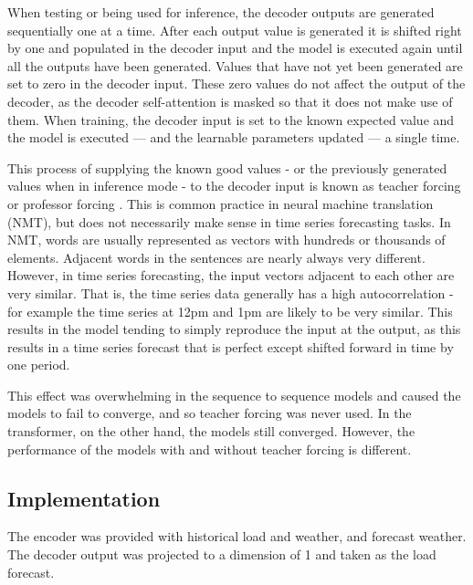 When testing or being used for inference, the decoder outputs are generated sequentially one at a time.
After each output value is generated it is shifted right by one and populated in the decoder input and the model is executed again until all the outputs have been generated.
Values that have not yet been generated are set to zero in the decoder input.
These zero values do not affect the output of the decoder, as the decoder self-attention is masked so that it does not make use of them.
When training, the decoder input is set to the known expected value and the model is executed --- and the learnable parameters updated --- a single time.

This process of supplying the known good values - or the previously generated values when in inference mode - to the decoder input is known as teacher forcing or professor forcing \cite{lamb2016professor}.
This is common practice in neural machine translation (NMT), but does not necessarily make sense in time series forecasting tasks.
In NMT, words are usually represented as vectors with hundreds or thousands of elements.
Adjacent words in the sentences are nearly always very different.
However, in time series forecasting, the input vectors adjacent to each other are very similar.
That is, the time series data generally has a high autocorrelation - for example the time series at 12pm and 1pm are likely to be very similar.
This results in the model tending to simply reproduce the input at the output, as this results in a time series forecast that is perfect except shifted forward in time by one period.

This effect was overwhelming in the sequence to sequence models and caused the models to fail to converge, and so teacher forcing was never used.
In the transformer, on the other hand, the models still converged.
However, the performance of the models with and without teacher forcing is different.

\subsection{Implementation}
The encoder was provided with historical load and weather, and forecast weather.
The decoder output was projected to a dimension of 1 and taken as the load forecast.


